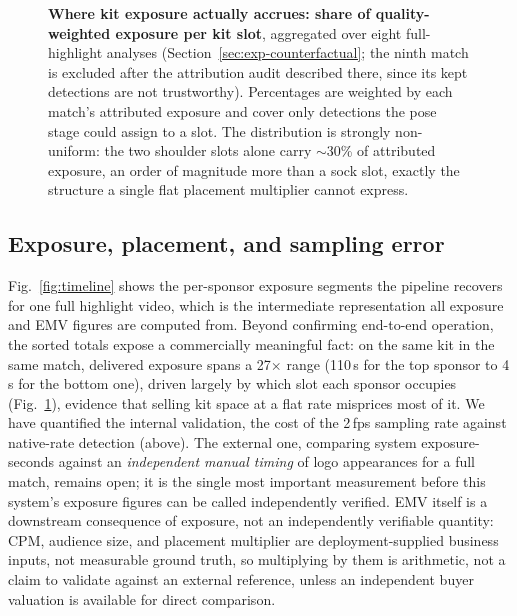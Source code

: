 \documentclass[conference,a4paper]{IEEEtran}
\begin{document}
\begin{figure}[!t]
\centering

\caption{\textbf{Where kit exposure actually accrues: share of quality-weighted
exposure per kit slot}, aggregated over eight full-highlight analyses
(Section~\ref{sec:exp-counterfactual}; the ninth match is excluded after the attribution
audit described there, since its kept detections are not trustworthy). Percentages
are weighted by each match's attributed exposure and cover only detections the pose
stage could assign to a slot. The
distribution is strongly non-uniform: the two shoulder slots alone carry
$\sim$30\% of attributed exposure, an order of magnitude more than a sock slot,
exactly the structure a single flat placement multiplier cannot express.}
\label{fig:kitslots}
\end{figure}

\subsection{Exposure, placement, and sampling error}
Fig.~\ref{fig:timeline} shows the per-sponsor exposure segments the pipeline recovers
for one full highlight video, which is the intermediate representation all exposure
and EMV figures are computed from. Beyond confirming end-to-end operation, the sorted
totals expose a commercially meaningful fact: on the same kit in the same match,
delivered exposure spans a 27$\times$ range (110\,s for the top sponsor to 4\,s for
the bottom one), driven largely by which slot each sponsor occupies
(Fig.~\ref{fig:kitslots}), evidence that selling kit space at a flat rate
misprices most of it. We have quantified the internal validation, the cost of the 2\,fps
sampling rate against native-rate detection (above). The external one, comparing
system exposure-seconds against an \emph{independent manual timing} of logo
appearances for a full match, remains open; it is the single most
important measurement before this system's exposure figures can be called
independently verified. EMV itself is a downstream consequence of exposure, not an
independently verifiable quantity: CPM,
audience size, and placement multiplier are deployment-supplied business inputs, not
measurable ground truth, so multiplying by them is arithmetic, not a claim to
validate against an external reference, unless an independent buyer valuation is
available for direct comparison.
\end{document}
